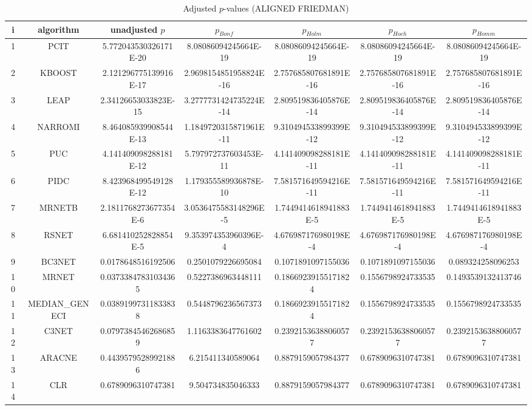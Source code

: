 \documentclass[a4paper,10pt]{article}
\begin{document}
\begin{landscape}
\begin{table}[!htp]
\centering\scriptsize
\caption{Adjusted $p$-values (ALIGNED FRIEDMAN)}
\begin{tabular}{ccccccc}
i&algorithm&unadjusted $p$&$p_{Bonf}$&$p_{Holm}$&$p_{Hoch}$&$p_{Homm}$\\
\hline
1&PCIT&5.772043530326171E-20&8.08086094245664E-19&8.08086094245664E-19&8.08086094245664E-19&8.08086094245664E-19\\
2&KBOOST&2.121296775139916E-17&2.9698154851958824E-16&2.757685807681891E-16&2.757685807681891E-16&2.757685807681891E-16\\
3&LEAP&2.34126653033823E-15&3.2777731424735224E-14&2.809519836405876E-14&2.809519836405876E-14&2.809519836405876E-14\\
4&NARROMI&8.464085939908544E-13&1.1849720315871961E-11&9.310494533899399E-12&9.310494533899399E-12&9.310494533899399E-12\\
5&PUC&4.141409098288181E-12&5.797972737603453E-11&4.141409098288181E-11&4.141409098288181E-11&4.141409098288181E-11\\
6&PIDC&8.423968499549128E-12&1.179355589936878E-10&7.581571649594216E-11&7.581571649594216E-11&7.581571649594216E-11\\
7&MRNETB&2.1811768273677354E-6&3.0536475583148296E-5&1.7449414618941883E-5&1.7449414618941883E-5&1.7449414618941883E-5\\
8&RSNET&6.681410252828854E-5&9.353974353960396E-4&4.676987176980198E-4&4.676987176980198E-4&4.676987176980198E-4\\
9&BC3NET&0.0178648516192506&0.2501079226695084&0.1071891097155036&0.1071891097155036&0.089324258096253\\
10&MRNET&0.03733847831034365&0.5227386963448111&0.18669239155171824&0.1556798924733535&0.1493539132413746\\
11&MEDIAN_GENECI&0.03891997311833838&0.5448796236567373&0.18669239155171824&0.1556798924733535&0.1556798924733535\\
12&C3NET&0.07973845462686859&1.1163383647761602&0.23921536388060577&0.23921536388060577&0.23921536388060577\\
13&ARACNE&0.44395795289921886&6.215411340589064&0.8879159057984377&0.6789096310747381&0.6789096310747381\\
14&CLR&0.6789096310747381&9.504734835046333&0.8879159057984377&0.6789096310747381&0.6789096310747381\\
\hline
\end{tabular}
\end{table}


\end{landscape}
\end{document}

